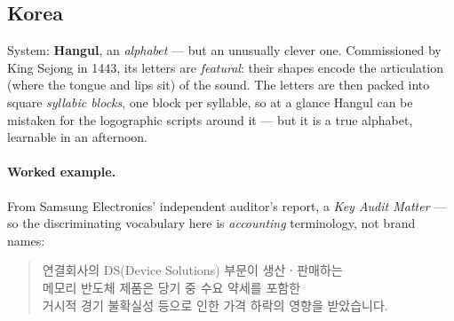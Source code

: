 \documentclass[11pt,a4paper]{report}
\begin{document}
\subsection{Korea}
System: \textbf{Hangul}, an \emph{alphabet} --- but an unusually clever one. Commissioned by King Sejong in
1443, its letters are \emph{featural}: their shapes encode the articulation (where the tongue and lips sit)
of the sound. The letters are then packed into square \emph{syllabic blocks}, one block per syllable, so at a
glance Hangul can be mistaken for the logographic scripts around it --- but it is a true alphabet, learnable
in an afternoon.

\paragraph{Worked example.} From Samsung Electronics' independent auditor's report, a \emph{Key Audit Matter}
--- so the discriminating vocabulary here is \emph{accounting} terminology, not brand names:
\begin{quote}
{\cjkKRfont 연결회사의 DS(Device Solutions) 부문이 생산ㆍ판매하는\\
메모리 반도체 제품은 당기 중 수요 약세를 포함한\\
거시적 경기 불확실성 등으로 인한 가격 하락의 영향을 받았습니다.}
\end{quote}
\end{document}
